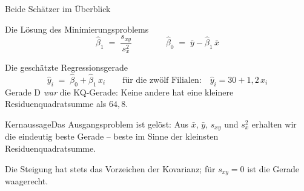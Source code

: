 \documentclass[aspectratio=169,11pt]{beamer}
\newcommand{\kernaussage}[1]{\begin{alertblock}{Kernaussage}#1\end{alertblock}}
\begin{document}
\begin{frame}{Beide Schätzer im Überblick}
  \begin{block}{Die Lösung des Minimierungsproblems}
    \[
      \hat{\beta}_1 \;=\; \frac{s_{xy}}{s_x^{2}}
      \qquad\qquad
      \hat{\beta}_0 \;=\; \bar{y} - \hat{\beta}_1\,\bar{x}
    \]
  \end{block}

  \begin{block}{Die geschätzte Regressionsgerade}
    \[
      \hat{y}_i \;=\; \hat{\beta}_0 + \hat{\beta}_1\, x_i
      \qquad\text{für die zwölf Filialen:}\quad \hat{y}_i = 30 + 1{,}2\,x_i
    \]
    Gerade D \emph{war} die KQ-Gerade: Keine andere hat eine kleinere
    Residuenquadratsumme als $64{,}8$.
  \end{block}

  \kernaussage{Das Ausgangsproblem ist gelöst: Aus $\bar{x}$, $\bar{y}$, $s_{xy}$
    und $s_x^{2}$ erhalten wir die eindeutig beste Gerade -- beste im Sinne der
    kleinsten Residuenquadratsumme.}

  \footnotesize Die Steigung hat stets das Vorzeichen der Kovarianz; für
  $s_{xy} = 0$ ist die Gerade waagerecht.
\end{frame}
\end{document}
